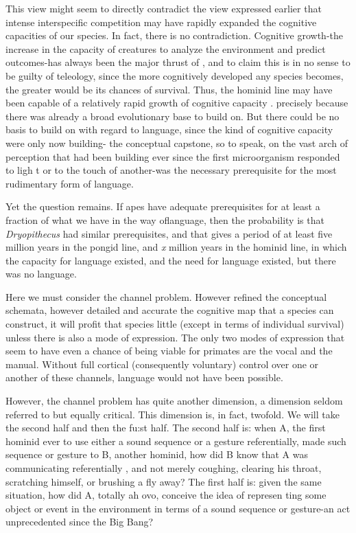 This view might seem to directly contradict the view expressed
earlier that intense interspecific competition may have rapidly ex\-panded the cognitive capacities of our species. In fact, there is no contradiction. Cognitive growth-the increase in the capacity of crea\-tures to analyze the environment and predict outcomes-has always been the major thrust of , and to claim this is in no sense to be guilty of teleology, since the more cognitively developed any species
becomes, the greater would be its chances of survival. Thus, the homi\-nid line may have been capable of a relatively rapid growth of cognitive capacity . precisely because there was already a broad evolutionary base to build on. But there could be no basis to build on with regard to language, since the kind of cognitive capacity  were only now building- the conceptual capstone, so to speak, on the vast arch of perception that had been building ever since the first microorganism responded to ligh t or to the touch of another-was the necessary prerequisite for the most rudimentary form of language.

Yet the question remains. If apes have adequate prerequisites for at least a fraction of what we have in the way oflanguage, then the probability is that \textit{Dryopithecus} had similar prerequisites, and that gives a period of at least five million years in the pongid line, and \textit{x} million years in the hominid line, in which the capacity for language existed, and the need for language existed, but there was no language.

Here we must consider the channel problem. However refined the conceptual schemata, however detailed and accurate the cognitive map that a species can construct, it will profit that species little (except in terms of individual survival) unless there is also a mode of expression. The only two modes of expression that seem to have even a chance of being viable for primates are the vocal and the manual. Without full cortical (consequently voluntary) control over one or another of these channels, language  would not have been possible.

However, the channel problem has quite another dimension, a dimension seldom referred to but equally critical. This dimension is, in fact, twofold. We will take the second half and then the fu:st half. The second half is: when A, the first hominid ever to use either a sound sequence or a gesture referentially, made such sequence or gesture to B, another hominid, how did B know that A was communicating referenti\-ally , and not merely coughing, clearing his throat, scratching himself, or brushing a fly away? The first half is: given the same situation, how did A, totally ah ovo, conceive the idea of represen ting some object or event in the environment in terms of a sound sequence or gesture-an act unprecedented since the Big Bang?

